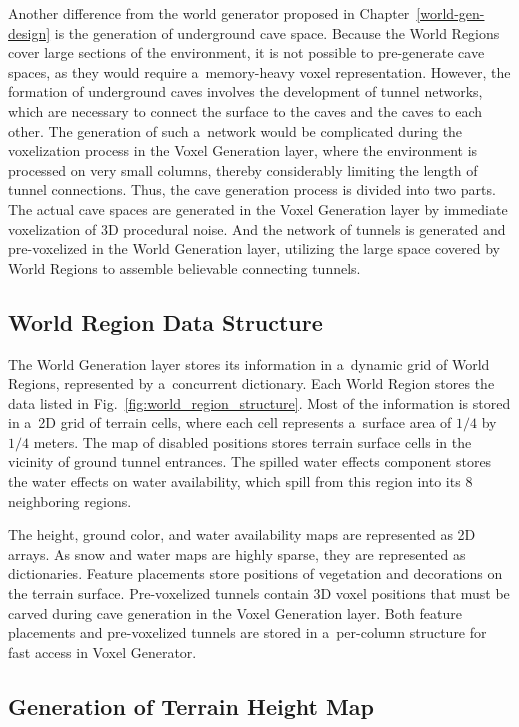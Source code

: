Another difference from the world generator proposed in Chapter~\ref{world-gen-design} is the generation of underground cave space. Because the World Regions cover large sections of the environment, it is not possible to pre-generate cave spaces, as they would require a~memory-heavy voxel representation. However, the formation of underground caves involves the development of tunnel networks, which are necessary to connect the surface to the caves and the caves to each other. The generation of such a~network would be complicated during the voxelization process in the Voxel Generation layer, where the environment is processed on very small columns, thereby considerably limiting the length of tunnel connections. Thus, the cave generation process is divided into two parts. The actual cave spaces are generated in the Voxel Generation layer by immediate voxelization of 3D procedural noise. And the network of tunnels is generated and pre-voxelized in the World Generation layer, utilizing the large space covered by World Regions to assemble believable connecting tunnels.

\subsection{World Region Data Structure}

The World Generation layer stores its information in a~dynamic grid of World Regions, represented by a~concurrent dictionary. Each World Region stores the data listed in Fig.~\ref{fig:world_region_structure}. Most of the information is stored in a~2D grid of terrain cells, where each cell represents a~surface area of $1/4$ by $1/4$ meters. The map of disabled positions stores terrain surface cells in the vicinity of ground tunnel entrances. The spilled water effects component stores the water effects on water availability, which spill from this region into its 8 neighboring regions.

The height, ground color, and water availability maps are represented as 2D arrays. As snow and water maps are highly sparse, they are represented as dictionaries. Feature placements store positions of vegetation and decorations on the terrain surface. Pre-voxelized tunnels contain 3D voxel positions that must be carved during cave generation in the Voxel Generation layer. Both feature placements and pre-voxelized tunnels are stored in a~per-column structure for fast access in Voxel Generator.

\subsection{Generation of Terrain Height Map}


